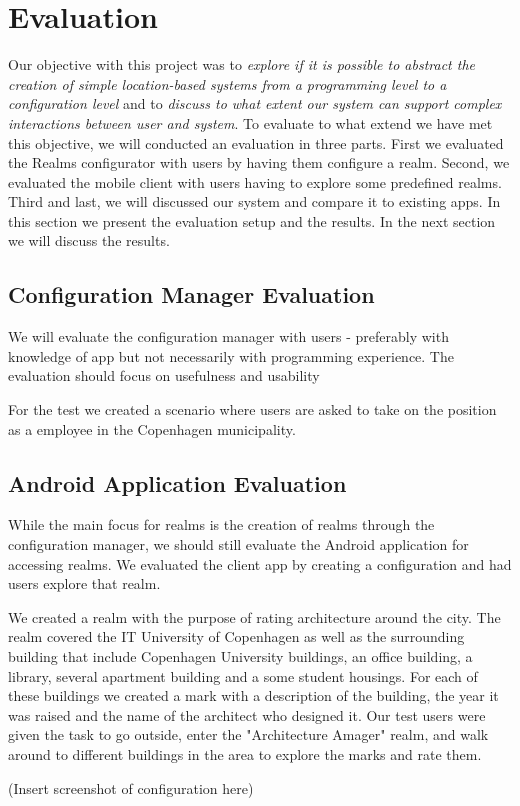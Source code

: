 \section{Evaluation}
\label{sec.eval}
Our objective with this project was to \emph{explore if it is possible to abstract the creation of simple location-based systems from a programming level to a configuration level} and to \emph{discuss to what extent our system can support complex interactions between user and system}. To evaluate to what extend we have met this objective, we will conducted an evaluation in three parts. First we evaluated the Realms configurator with users by having them configure a realm. Second, we evaluated the mobile client with users having to explore some predefined realms. Third and last, we will discussed our system and compare it to existing apps. In this section we present the evaluation setup and the results. In the next section we will discuss the results.

\subsection{Configuration Manager Evaluation} %
\label{sub:configuration_manager_evaluation}
We will evaluate the configuration manager with users - preferably with knowledge of app but not necessarily with programming experience. The evaluation should focus on usefulness and usability

For the test we created a scenario where users are asked to take on the position as a employee in the Copenhagen municipality. 

\subsection{Android Application Evaluation} %
\label{sub:android_application_evaluation}
While the main focus for realms is the creation of realms through the configuration manager, we should still evaluate the Android application for accessing realms. We evaluated the client app by creating a configuration and had users explore that realm.

We created a realm with the purpose of rating architecture around the city. The realm covered the IT University of Copenhagen as well as the surrounding building that include Copenhagen University buildings, an office building, a library, several apartment building and a some student housings. For each of these buildings we created a  mark with a description of the building, the year it was raised and the name of the architect who designed it. Our test users were given the task to go outside, enter the "Architecture Amager" realm, and walk around to different buildings in the area to explore the marks and rate them.  

(Insert screenshot of configuration here)
